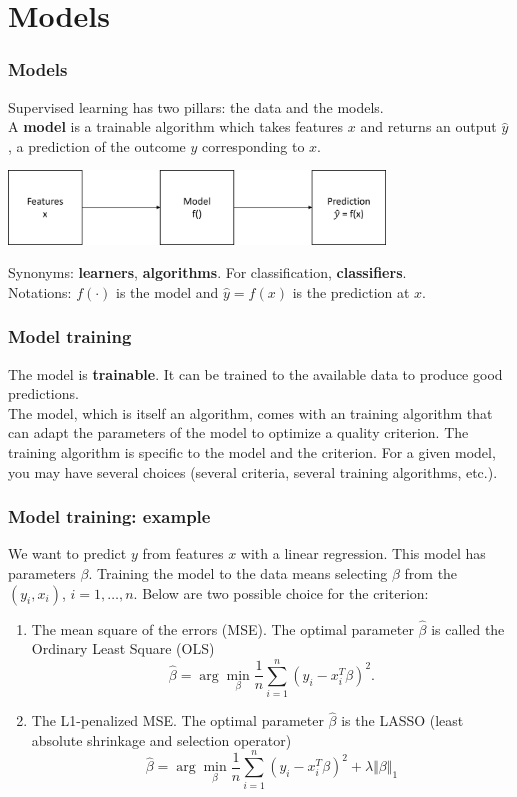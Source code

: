 \section{Models}
\begin{frame}
\frametitle{Models}
Supervised learning has two pillars: the data and the models.\\
\vspace{0.3cm}
A {\bf model} is a trainable algorithm which takes features $x$ and returns an output $\hat{y}$, a prediction of the outcome $y$ corresponding to $x$.
\begin{center}
\includegraphics[width=10cm]{../Graphs/ML1.png}
\end{center}
Synonyms: {\bf learners}, {\bf algorithms}. For classification, {\bf classifiers}. \\
\vspace{0.3cm}
Notations: $f(\cdot)$ is the model and $\hat{y} = f(x)$ is the prediction at $x$.
\end{frame}
\begin{frame}
\frametitle{Model training}
The model is {\bf trainable}. It can be trained to the available data to produce good predictions.\\
\vspace{0.3cm}
The model, which is itself an algorithm, comes with an training algorithm that can adapt the parameters of the model to optimize a quality criterion. The training algorithm is specific to the model and the criterion. For a given model, you may have several choices (several criteria, several training algorithms, etc.).
\end{frame}
\begin{frame}
\frametitle{Model training: example}
We want to predict $y$ from features $x$ with a linear regression. This model has parameters $\beta$. Training the model to the data means selecting $\beta$ from the $(y_i,x_i)$, $i=1,\ldots,n$. Below are two possible choice for the criterion:
\begin{enumerate}
\item The mean square of the errors (MSE). The optimal parameter $\hat{\beta}$ is called the Ordinary Least Square (OLS) 
$$
\hat{\beta} = \arg\min_\beta \frac{1}{n}\sum_{i=1}^n (y_i - x_i^T \beta)^2.
$$
\item The L1-penalized MSE. The optimal parameter $\hat{\beta}$ is the LASSO (least absolute shrinkage and selection operator) 
$$
\hat{\beta} = \arg\min_\beta \frac{1}{n}\sum_{i=1}^n (y_i - x_i^T \beta)^2 + \lambda \Vert \beta\Vert_1
$$
\end{enumerate}
\end{frame}

